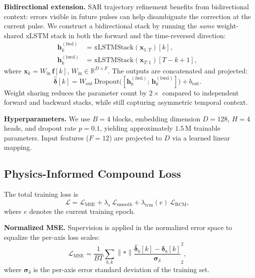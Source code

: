 \documentclass[conference]{IEEEtran}
\newcommand{\vdelta}{\bm{\delta}}
\newcommand{\norm}[1]{\left\lVert#1\right\rVert}
\begin{document}
\textbf{Bidirectional extension.}
SAR trajectory refinement benefits from bidirectional context:
errors visible in future pulses can help disambiguate the correction at the
current pulse.
We construct a bidirectional stack by running the \emph{same} weight-shared
xLSTM stack in both the forward and the time-reversed direction:
\begin{align}
  \mathbf{h}_k^{(\text{fwd})} &= \text{xLSTMStack}(\mathbf{x}_{1:T})[k], \\
  \mathbf{h}_k^{(\text{bwd})} &= \text{xLSTMStack}(\mathbf{x}_{T:1})[T{-}k{+}1],
\end{align}
where $\mathbf{x}_k = W_\text{in}\,\mathbf{f}[k]$, $W_\text{in}\in\mathbb{R}^{D\times F}$.
The outputs are concatenated and projected:
\begin{equation}
  \hat{\vdelta}[k] = W_\text{out}\,\text{Dropout}\bigl(
    [\mathbf{h}_k^{(\text{fwd})};\, \mathbf{h}_k^{(\text{bwd})}]\bigr) + b_\text{out}.
  \label{eq:output}
\end{equation}
Weight sharing reduces the parameter count by $2\times$ compared to independent
forward and backward stacks, while still capturing asymmetric temporal context.

\textbf{Hyperparameters.}
We use $B{=}4$ blocks, embedding dimension $D{=}128$, $H{=}4$ heads, and
dropout rate $p{=}0.1$, yielding approximately $1.5$\,M trainable parameters.
Input features ($F{=}12$) are projected to $D$ via a learned linear mapping.

\subsection{Physics-Informed Compound Loss}
\label{sec:loss}

The total training loss is
\begin{equation}
  \mathcal{L} = \mathcal{L}_\text{MSE}
              + \lambda_s\,\mathcal{L}_\text{smooth}
              + \lambda_\text{rcm}(e)\,\mathcal{L}_\text{RCM},
  \label{eq:total_loss}
\end{equation}
where $e$ denotes the current training epoch.

\textbf{Normalized MSE.}
Supervision is applied in the normalized error space to equalize the
per-axis loss scales:
\begin{equation}
  \mathcal{L}_\text{MSE} = \frac{1}{BT}
    \sum_{b,k}\norm*{\frac{\hat{\vdelta}_b[k] - \vdelta_b[k]}{\bm{\sigma}_\delta}}_2^2,
  \label{eq:mse}
\end{equation}
where $\bm{\sigma}_\delta$ is the per-axis error standard deviation of the training set.
\end{document}
